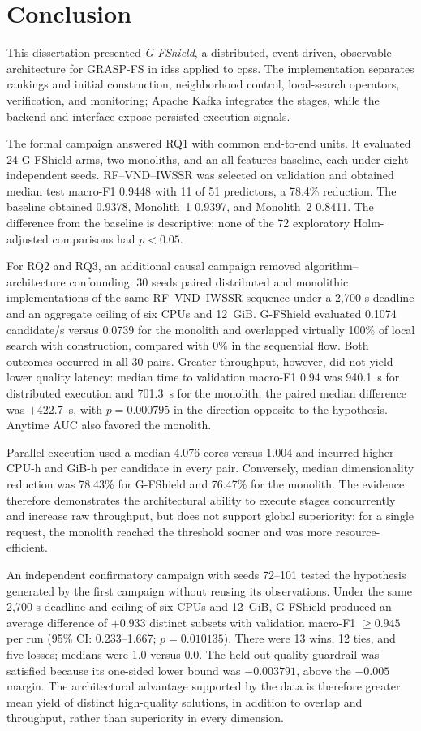 \chapter{Conclusion}
\label{chapter:conclusao}

This dissertation presented \textit{G-FShield}, a distributed, event-driven, observable architecture for GRASP-FS in \acp{ids} applied to \acp{cps}. The implementation separates rankings and initial construction, neighborhood control, local-search operators, verification, and monitoring; Apache Kafka integrates the stages, while the backend and interface expose persisted execution signals.

The formal campaign answered RQ1 with common end-to-end units. It evaluated 24 G-FShield arms, two monoliths, and an all-features baseline, each under eight independent seeds. RF--VND--IWSSR was selected on validation and obtained median test macro-F1 0.9448 with 11 of 51 predictors, a 78.4\% reduction. The baseline obtained 0.9378, Monolith~1 0.9397, and Monolith~2 0.8411. The difference from the baseline is descriptive; none of the 72 exploratory Holm-adjusted comparisons had $p<0.05$.

For RQ2 and RQ3, an additional causal campaign removed algorithm--architecture confounding: 30 seeds paired distributed and monolithic implementations of the same RF--VND--IWSSR sequence under a 2,700-s deadline and an aggregate ceiling of six CPUs and 12~GiB. G-FShield evaluated 0.1074 candidate/s versus 0.0739 for the monolith and overlapped virtually 100\% of local search with construction, compared with 0\% in the sequential flow. Both outcomes occurred in all 30 pairs. Greater throughput, however, did not yield lower quality latency: median time to validation macro-F1 0.94 was 940.1~s for distributed execution and 701.3~s for the monolith; the paired median difference was $+422.7$~s, with $p=0.000795$ in the direction opposite to the hypothesis. Anytime AUC also favored the monolith.

Parallel execution used a median 4.076 cores versus 1.004 and incurred higher CPU-h and GiB-h per candidate in every pair. Conversely, median dimensionality reduction was 78.43\% for G-FShield and 76.47\% for the monolith. The evidence therefore demonstrates the architectural ability to execute stages concurrently and increase raw throughput, but does not support global superiority: for a single request, the monolith reached the threshold sooner and was more resource-efficient.

An independent confirmatory campaign with seeds 72--101 tested the hypothesis generated by the first campaign without reusing its observations. Under the same 2,700-s deadline and ceiling of six CPUs and 12~GiB, G-FShield produced an average difference of $+0.933$ distinct subsets with validation macro-F1 $\geq 0.945$ per run (95\% CI: 0.233--1.667; $p=0.010135$). There were 13 wins, 12 ties, and five losses; medians were 1.0 versus 0.0. The held-out quality guardrail was satisfied because its one-sided lower bound was $-0.003791$, above the $-0.005$ margin. The architectural advantage supported by the data is therefore greater mean yield of distinct high-quality solutions, in addition to overlap and throughput, rather than superiority in every dimension.

